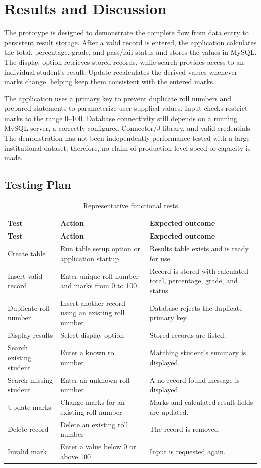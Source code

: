 \documentclass[11pt,a4paper]{report}
\begin{document}
\section{Results and Discussion}
The prototype is designed to demonstrate the complete flow from data entry to persistent result storage. After a valid record is entered, the application calculates the total, percentage, grade, and pass/fail status and stores the values in MySQL. The display option retrieves stored records, while search provides access to an individual student's result. Update recalculates the derived values whenever marks change, helping keep them consistent with the entered marks.

The application uses a primary key to prevent duplicate roll numbers and prepared statements to parameterize user-supplied values. Input checks restrict marks to the range 0--100. Database connectivity still depends on a running MySQL server, a correctly configured Connector/J library, and valid credentials. The demonstration has not been independently performance-tested with a large institutional dataset; therefore, no claim of production-level speed or capacity is made.

\subsection{Testing Plan}
\begin{longtable}{|p{3cm}|p{5cm}|p{5.5cm}|}
\caption{Representative functional tests}\\\hline
\textbf{Test} & \textbf{Action} & \textbf{Expected outcome}\\\hline
\endfirsthead
\hline \textbf{Test} & \textbf{Action} & \textbf{Expected outcome}\\\hline
\endhead
Create table & Run table setup option or application startup & Results table exists and is ready for use.\\\hline
Insert valid record & Enter unique roll number and marks from 0 to 100 & Record is stored with calculated total, percentage, grade, and status.\\\hline
Duplicate roll number & Insert another record using an existing roll number & Database rejects the duplicate primary key.\\\hline
Display results & Select display option & Stored records are listed.\\\hline
Search existing student & Enter a known roll number & Matching student's summary is displayed.\\\hline
Search missing student & Enter an unknown roll number & A no-record-found message is displayed.\\\hline
Update marks & Change marks for an existing roll number & Marks and calculated result fields are updated.\\\hline
Delete record & Delete an existing roll number & The record is removed.\\\hline
Invalid mark & Enter a value below 0 or above 100 & Input is requested again.\\\hline
\end{longtable}
\end{document}
